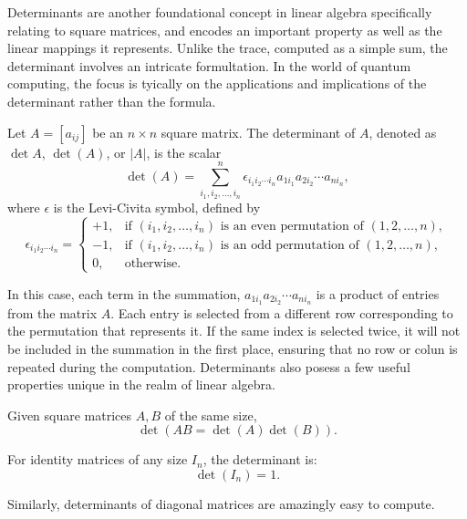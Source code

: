 \documentclass[12pt]{article}
\begin{document}
Determinants are another foundational concept in linear algebra specifically relating to square matrices, and encodes an important property as well as the linear mappings it represents. Unlike the trace, computed as a simple sum, the determinant involves an intricate formultation. In the world of quantum computing, the focus is tyically on the applications and implications of the determinant rather than the formula. 

\begin{definition}[Determinant]
    Let $A = [a_{ij}]$ be an $n \times n$ square matrix. The determinant of $A$, denoted as $\det A$, $\det(A)$, or $\lvert A \rvert$, is the scalar
    \[
        \det(A) = \sum_{i_{1}, i_{2}, \ldots, i_{n}}^n \epsilon_{i_{1} i_{2} \cdots i_{n}} a_{1 i_{1}} a_{2 i_{2}} \cdots a_{n i_{n}},
    \]
    where $\epsilon$ is the Levi-Civita symbol, defined by
    \[
        \epsilon_{i_{1} i_{2} \cdots i_{n}} =
        \begin{cases}
            +1, & \text{if } (i_{1}, i_{2}, \ldots, i_{n}) \text{ is an even permutation of } (1, 2, \ldots, n), \\
            -1, & \text{if } (i_{1}, i_{2}, \ldots, i_{n}) \text{ is an odd permutation of } (1, 2, \ldots, n), \\
            0,  & \text{otherwise}.
        \end{cases}
    \]
\end{definition}

In this case, each term in the summation, $a_{1 i_{1}} a_{2 i_{2}} \cdots a_{n i_{n}}$ is a product of entries from the matrix $A$. Each entry is selected from a different row corresponding to the permutation that represents it. If the same index is selected twice, it will not be included in the summation in the first place, ensuring that no row or colun is repeated during the computation. Determinants also posess a few useful properties unique in the realm of linear algebra. 

\begin{theorem}
    Given square matrices $A, B$ of the same size, 
    $$\operatorname{det}(AB = \det(A)\det(B)).$$
\end{theorem}

\begin{theorem}
    For identity matrices of any size $I_n$, the determinant is:
    $$\det(I_n) = 1.$$
\end{theorem}

Similarly, determinants of diagonal matrices are amazingly easy to compute. 
\end{document}

